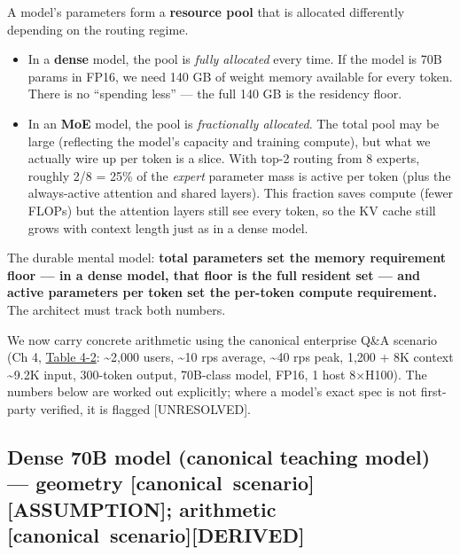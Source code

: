 \label{mental-model}


A model's parameters form a \textbf{resource pool} that is allocated
differently depending on the routing regime.

\begin{itemize}
\tightlist
\item
  In a \textbf{dense} model, the pool is \emph{fully allocated} every
  time. If the model is 70B params in FP16, we need 140 GB of weight
  memory available for every token. There is no ``spending less'' ---
  the full 140 GB is the residency floor.
\item
  In an \textbf{MoE} model, the pool is \emph{fractionally allocated}.
  The total pool may be large (reflecting the model's capacity and
  training compute), but what we actually wire up per token is a slice.
  With top-2 routing from 8 experts, roughly 2/8 = 25\% of the
  \emph{expert} parameter mass is active per token (plus the
  always-active attention and shared layers). This fraction saves
  compute (fewer FLOPs) but the attention layers still see every token,
  so the KV cache still grows with context length just as in a dense
  model.
\end{itemize}

The durable mental model: \textbf{total parameters set the memory
requirement floor --- in a dense model, that floor is the full resident
set --- and active parameters per token set the per-token compute
requirement.} The architect must track both numbers.

\label{worked-example}


We now carry concrete arithmetic using the canonical enterprise Q\&A
scenario (Ch 4, \hyperref[tab:4.2]{Table 4-2}: \textasciitilde2,000 users, \textasciitilde10
rps average, \textasciitilde40 rps peak, 1,200 + 8K context
\textasciitilde9.2K input, 300-token output, 70B-class model, FP16, 1
host 8×H100). The numbers below are worked out explicitly; where a
model's exact spec is not first-party verified, it is flagged
\mbox{{[}UNRESOLVED{]}}.

\subsection{Dense 70B model (canonical teaching model) --- geometry
\mbox{{[}canonical scenario{]}}\hspace{0pt}\mbox{{[}ASSUMPTION{]}}; arithmetic \mbox{{[}canonical
scenario{]}}\hspace{0pt}\mbox{{[}DERIVED{]}}}\label{dense-70b-model-canonical-teaching-model-geometry-canonical-scenarioassumption-arithmetic-canonical-scenarioderived}

